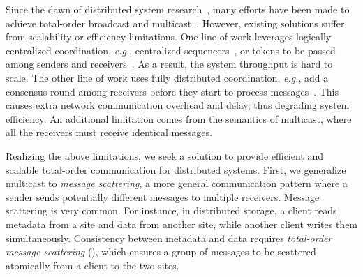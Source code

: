 Since the dawn of distributed system research~\cite{lamport1978time}, many efforts have been made to achieve total-order broadcast and multicast~\cite{defago2004total}.
However, existing solutions suffer from scalability or efficiency limitations. One line of work leverages logically centralized coordination, \textit{e.g.}, centralized sequencers~\cite{eris}, or tokens to be passed among senders and receivers~\cite{rajagopalan1989token,kim1997total,ekwall2004token}. As a result, the system throughput is hard to scale. The other line of work uses fully distributed coordination, \textit{e.g.}, add a consensus round among receivers before they start to process messages~\cite{lamport1978time,chandra1996unreliable}. This causes extra network communication overhead and delay, thus degrading system efficiency.
An additional limitation comes from the semantics of multicast, where all the receivers must receive identical messages.

Realizing the above limitations, we seek a solution to provide efficient and scalable total-order communication for distributed systems.
First, we generalize multicast to \textit{message scattering}, a more general communication pattern where a sender sends potentially different messages to multiple receivers. Message scattering is very common. For instance, in distributed storage, a client reads metadata from a site and data from another site, while another client writes them simultaneously. Consistency between metadata and data requires \textit{total-order message scattering} (\sys), which ensures a group of messages to be scattered atomically from a client to the two sites.

